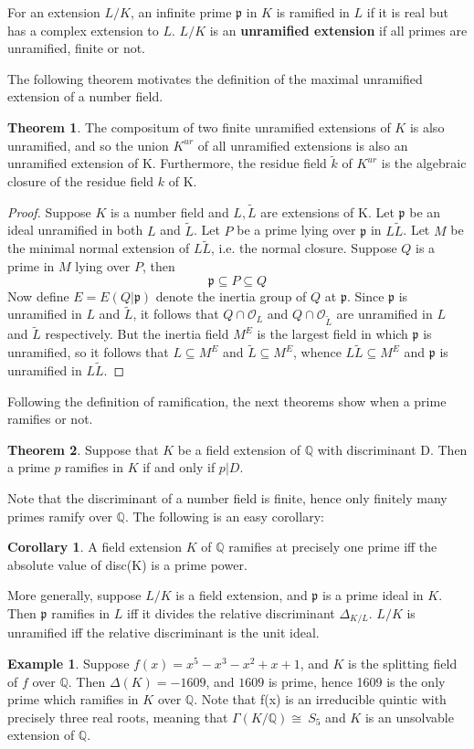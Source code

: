 \documentclass[12pt]{extarticle}
\newcommand{\Q}{\mathbb{Q}}
\newcommand{\GG}{\Gamma(K/\mathbb{Q})}
\newcommand{\<}{\langle}
\renewcommand{\>}{\rangle}
\theoremstyle{definition}
\newtheorem{theorem}{Theorem}
\newtheorem{corollary}{Corollary}
\newtheorem*{example}{Example}
\begin{document}
For an extension $L/K$, an infinite prime $\mathfrak{p}$ in $K$ is ramified in $L$ if it is real but has a complex extension to $L$. $L/K$ is an \textbf{unramified extension} if all primes are unramified, finite or not. 
\par
The following theorem motivates the definition of the maximal unramified extension of a number field. 
\begin{theorem}
The compositum of two finite unramified extensions of $K$ is also unramified, and so the union $K^{ur}$ of all unramified extensions is also an unramified extension of K. Furthermore, the residue field $\tilde{k}$ of $K^{ur}$ is the algebraic closure of the residue field $k$ of K.
\end{theorem}
\begin{proof}
    Suppose $K$ is a number field and $L,\tilde{L}$ are extensions of K. Let $\mathfrak{p}$ be an ideal unramified in both $L$ and $\tilde{L}$. Let $P$ be a prime lying over $\mathfrak{p}$ in $L\tilde{L}$. Let $M$ be the minimal normal extension of $L\tilde{L}$, i.e. the normal closure. Suppose $Q$ is a prime in $M$ lying over $P$, then  
    \begin{equation}
        \mathfrak{p}\subseteq P \subseteq Q
    \end{equation}
    Now define $E=E(Q|\mathfrak{p})$ denote the inertia group of $Q$ at $\mathfrak{p}$. 
    Since $\mathfrak{p}$ is unramified in $L$ and $\tilde{L}$, it follows that $Q \cap \mathcal{O}_L$ and $Q \cap \mathcal{O}_{\tilde{L}}$ are unramified in $L$ and $\tilde{L}$ respectively. 
 But the inertia field $M^E$ is the largest field in which $\mathfrak{p}$ is unramified, so it follows that $L\subseteq M^E$ and $\tilde{L} \subseteq M^E $, whence $L\tilde{L}\subseteq M^E$ and $\mathfrak{p}$ is unramified in $L\tilde{L}$.
\end{proof}

Following the definition of ramification, the next theorems show when a prime ramifies or not. 
\begin{theorem}
 Suppose that $K$ be a field extension of $\Q$ with discriminant D. Then a prime $p$
ramifies in $K$ if and only if $p|D$.   
\end{theorem}
Note that the discriminant of a number field is finite, hence only finitely many primes ramify over $\Q$. The following is an easy corollary:
\begin{corollary}
A field extension $K$ of $\Q$ ramifies at precisely one prime iff the absolute value of disc(K) is a prime power.
\end{corollary}
More generally, suppose $L/K$ is a field extension, and $\mathfrak{p}$ is a prime ideal in $K$. Then $\mathfrak{p}$ ramifies in $L$ iff it divides the relative discriminant $\Delta_{K/L}$. $L/K$ is unramified iff the relative discriminant is the unit ideal. 
\begin{example}
    Suppose $f(x)=  x^5 - x^3 - x^2 + x + 1$, and $K$ is the splitting field of $f$ over $\Q$. Then $\Delta(K)=-1609$, and $1609$ is prime, hence 1609 is the only prime which ramifies in $K$ over $\Q$. Note that f(x) is an irreducible quintic with precisely three real roots, meaning that $\GG \cong\ S_5$ and $K$ is an unsolvable extension of $\Q$.
\end{example}
\end{document}
